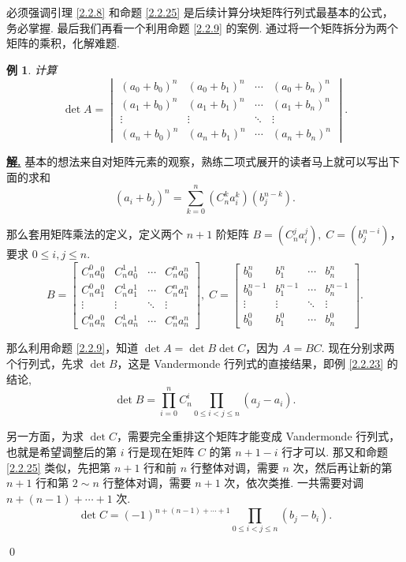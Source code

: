 \documentclass[10pt,openany]{article}
\theoremstyle{thmstyle} %
\theoremstyle{defstyle} %
\theoremstyle{prostyle} %
\theoremstyle{exastyle}
\newtheorem{example}[theorem]{例}
\theoremstyle{remstyle}
\newenvironment{solution}{\par\underline{\textbf{解.}} \;\fangsong}{\qed\par}
\begin{document}
必须强调引理 \ref{2.2.8} 和命题 \ref{2.2.25} 是后续计算分块矩阵行列式最基本的公式，务必掌握. 最后我们再看一个利用命题 \ref{2.2.9} 的案例. 通过将一个矩阵拆分为两个矩阵的乘积，化解难题.

\begin{example}
	计算
	\[ \det A = \begin{vmatrix}
		(a_0 + b_0)^n & (a_0 + b_1)^n & \cdots & (a_0 + b_n)^n \\
		(a_1 + b_0)^n & (a_1 + b_1)^n & \cdots & (a_1 + b_n)^n \\
		\vdots & \vdots & \ddots & \vdots \\
		(a_n + b_0)^n & (a_n + b_1)^n & \cdots & (a_n + b_n)^n
	\end{vmatrix}. \]
\end{example}

\begin{solution}
	基本的想法来自对矩阵元素的观察，熟练二项式展开的读者马上就可以写出下面的求和
	\[ (a_i+b_j)^n=\sum_{k=0}^{n} (C_n^k a_i^k) (b_j^{n-k}). \]
	
	那么套用矩阵乘法的定义，定义两个 \( n+1 \) 阶矩阵 \( B=(C_n^j a_i^j), \; C=(b_j^{n-i}) \)，要求 \( 0 \leq i,j \leq n \). 
	\[ B= \begin{bmatrix}
		C_n^0 a_0^0 & C_n^1 a_0^1 & \cdots & C_n^n a_0^n \\
		C_n^0 a_1^0 & C_n^1 a_1^1 & \cdots & C_n^n a_1^n \\
		\vdots & \vdots & \ddots & \vdots \\
		C_n^0 a_n^0 & C_n^1 a_n^1 & \cdots & C_n^n a_n^n 
	\end{bmatrix}, \; C= \begin{bmatrix}
	b_0^{n} & b_1^{n} & \cdots & b_n^{n} \\
	b_0^{n-1} & b_1^{n-1} & \cdots & b_n^{n-1} \\
	\vdots & \vdots & \ddots & \vdots \\
	b_0^{0} & b_1^{0} & \cdots & b_n^{0}  
	\end{bmatrix}. \]
	
	那么利用命题 \ref{2.2.9}，知道 \( \det A=\det B\det C \)，因为 \( A=BC \). 现在分别求两个行列式，先求 \( \det B \)，这是 Vandermonde 行列式的直接结果，即例 \ref{2.2.23} 的结论, 
	\[  \det B= \prod_{i=0}^{n} C_n^i \prod_{0 \leq i<j \leq n}^{} (a_j-a_i). \]
	
	另一方面，为求 \( \det C \)，需要完全重排这个矩阵才能变成 Vandermonde 行列式，也就是希望调整后的第 \( i \) 行是现在矩阵 \( C \) 的第 \( n+1-i \) 行才可以. 那又和命题 \ref{2.2.25} 类似，先把第 \( n+1 \) 行和前 \( n \) 行整体对调，需要 \( n \) 次，然后再让新的第 \( n+1 \) 行和第 \( 2 \sim n \) 行整体对调，需要 \( n+1 \) 次，依次类推. 一共需要对调 \( n+(n-1)+\cdots+1 \) 次.
	\[ \det C= (-1)^{n+(n-1)+\cdots+1} \prod_{0 \leq i<j \leq n}^{} (b_j-b_i). \]
	

\end{solution}
\end{document}
